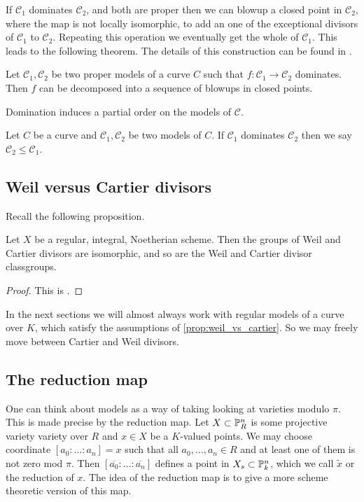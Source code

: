 If $\mathscr C_1 $ dominates $\mathscr C_2$, and both are proper then we can blowup a closed point in $\mathscr C_2$, where the map is not locally isomorphic, to add an one of the exceptional divisors of $\mathscr C_1$ to $\mathscr C_2$. 
Repeating this operation we eventually get the whole of $\mathscr C_1$. 
This leads to the following theorem. The details of this construction can be found in \cite[sec.\ 9.1.2]{liuAlgebraicGeometryArithmetic2002}.
\begin{theorem}\label{thm:factorisation_theorem}
	Let $\mathscr C_1, \mathscr C_2$ be two proper models of a curve $C$ such that $f: \mathscr C_1 \to \mathscr C_2$ dominates. 
	Then $f$ can be decomposed into a sequence of blowups in closed points. 
\end{theorem}

Domination induces a partial order on the models of $\mathscr C$. 
\begin{definition}
	Let $C$ be a curve and $\mathscr C_1, \mathscr C_2$ be two models of $C$. 
	If $\mathscr C_1$ dominates $\mathscr C_2$ then we say $\mathscr C_2 \le \mathscr C_1$.
\end{definition}





\subsection{Weil versus Cartier divisors} \label{sec:weil_versus_cartier_divisors}

Recall the following proposition. 
\begin{proposition}\label{prop:weil_vs_cartier}
	Let $X$ be a regular, integral, Noetherian scheme. Then the groups of Weil and Cartier divisors are isomorphic, and so are the Weil and Cartier divisor classgroups. 
\end{proposition}
\begin{proof}
	This is \cite[prop.\ 7.2.16]{liuAlgebraicGeometryArithmetic2002}. 
\end{proof}

In the next sections we will almost always work with regular models of a curve over $K$, which satisfy the assumptions of \cref{prop:weil_vs_cartier}. So we may freely move between Cartier and Weil divisors. 

\subsection{The reduction map} \label{sec:the_reduction_map_models}
One can think about models as a way of taking looking at varieties modulo $\pi$. 
This is made precise by the reduction map. 
Let $ X\subset \mathbb{P}^{n}_R$ is some projective variety variety over $R$ and $x \in X$ be a $K$-valued points. 
We may choose coordinate $[a_0:\ldots:a_n] = x$ such that all $a_0, \ldots, a_n \in R$ and at least one of them is not zero mod $\pi$.  
Then $[\overline{a_0}: \ldots :\overline{a_n}]$ defines a point in $X_s \subset  \mathbb{P}^{n}_k$, which we call $\tilde x$ or the reduction of $x$.  
The idea of the reduction map is to give a more scheme theoretic version of this map. 

